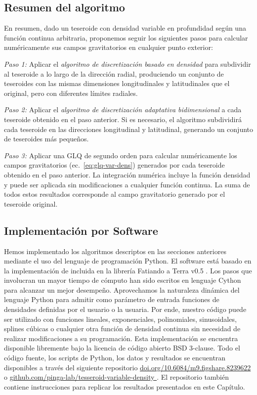 \subsection{Resumen del algoritmo}

En resumen, dado un teseroide con densidad variable en profundidad según una
función continua arbitraria, proponemos seguir los siguientes pasos para
calcular numéricamente sus campos gravitatorios en cualquier punto exterior:

\textit{Paso 1:}
Aplicar el \emph{algoritmo de discretización basado en densidad} para
subdividir al teseroide a lo largo de la dirección radial, produciendo un
conjunto de teseroides con las mismas dimensiones longitudinales
y latitudinales que el original, pero con diferentes límites radiales.

\textit{Paso 2:}
Aplicar el \emph{algoritmo de discretización adaptativa bidimensional} a cada
teseroide obtenido en el paso anterior.
Si es necesario, el algoritmo subdividirá cada teseroide en las direcciones
longitudinal y latitudinal, generando un conjunto de teseroides más pequeños.

\textit{Paso 3:}
Aplicar una \ac{GLQ} de segundo orden para calcular numéricamente los campos
gravitatorios (ec.~\ref{eq:glq-var-dens}) generados por cada teseroide
obtenido en el paso anterior. La integración numérica incluye la función
densidad y puede ser aplicada sin modificaciones a cualquier función continua.
La suma de todos estos resultados corresponde al campo gravitatorio generado
por el teseroide original.


\subsection{Implementación por Software}

Hemos implementado los algoritmos descriptos en las secciones anteriores
mediante el uso del lenguaje de programación Python.
El software está basado en la implementación de \citet{uieda2016} incluida en
la librería Fatiando a Terra v0.5 \citep{uieda2013}.
Los pasos que involucran un mayor tiempo de cómputo han sido escritos en
lenguaje Cython para alcanzar un mejor desempeño.
Aprovechamos la naturaleza dinámica del lenguaje Python para admitir como
parámetro de entrada funciones de densidades definidas por el usuario o la
usuaria.
Por ende, nuestro código puede ser utilizado con funciones lineales,
exponenciales, polinomiales, sinusoidales, splines cúbicas o cualquier otra
función de densidad continua sin necesidad de realizar modificaciones a su
programación.
Esta implementación se encuentra disponible libremente bajo la licencia
de código abierto BSD 3-clause.
Todo el código fuente, los scripts de Python, los datos y resultados se
encuentran disponibles a través del siguiente repositorio
\href{
    https://doi.org/10.6084/m9.figshare.8239622
}{
    doi.org/10.6084/m9.figshare.8239622
}
\citep{soler2019b} o
\href{
    https://github.com/pinga-lab/tesseroid-variable-density
}{
    github.com/pinga-lab/tesseroid-variable-density
}.
El repositorio también contiene instrucciones para replicar los resultados
presentados en este Capítulo.



